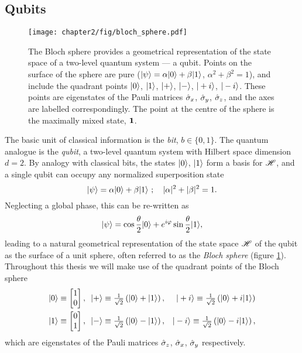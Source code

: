 \subsection{Qubits}
\label{sec:qubits}
\begin{figure}[t!]
\centering
\texttt{[image: chapter2/fig/bloch\_sphere.pdf]}
\caption[Bloch sphere]{
The Bloch sphere provides a geometrical representation of the state space of a two-level quantum system --- a qubit. Points on the surface of the sphere are pure ($\mbox{$ | \psi \rangle $} = \alpha \mbox{$ | 0 \rangle $} + \beta \mbox{$ | 1 \rangle $}$, $\alpha^2+\beta^2=1$), and include the quadrant points $\mbox{$ | 0 \rangle $}$, $\mbox{$ | 1 \rangle $}$, $\mbox{$ | + \rangle $}$, $\mbox{$ | - \rangle $}$, $\mbox{$ | +i \rangle $}$, $\mbox{$ | -i \rangle $}$. These points are eigenstates of the Pauli matrices $\hat{\sigma}_x$, $\hat{\sigma}_y$, $\hat{\sigma}_z$, and the axes are labelled correspondingly. The point at the centre of the sphere is the maximally mixed state, $\mathbf{1}$.
}
\label{fig:bloch-sphere}
\end{figure}

The basic unit of classical information is the \emph{bit}, $b \in \{ 0, 1\}$. The quantum analogue is the \emph{qubit}, a two-level quantum system with Hilbert space dimension $d=2$. By analogy with classical bits, the states $\mbox{$ | 0 \rangle $}$, $\mbox{$ | 1 \rangle $}$ form a basis for $\mathscr{H}$, and a single qubit can occupy any normalized superposition state
\begin{equation}
   \mbox{$ | \psi \rangle $} = \alpha \mbox{$ | 0 \rangle $} + \beta \mbox{$ | 1 \rangle $} ~ ; \quad |\alpha|^2+ |\beta|^2=1.
\end{equation}
Neglecting a global phase, this can be re-written as 
\begin{equation}
   \mbox{$ | \psi \rangle $}= \cos \frac{\theta}{2}\mbox{$ | 0 \rangle $} + e^{i \varphi} \sin \frac{\theta}{2} \mbox{$ | 1 \rangle $} ,
\end{equation}
leading to a natural geometrical representation of the state space $\mathscr{H}$ of the qubit as the surface of a unit sphere, often referred to as the \emph{Bloch sphere} (figure \ref{fig:bloch-sphere}). Throughout this thesis we will make use of the quadrant points of the Bloch sphere
\begin{eqnarray}
    \mbox{$ | 0 \rangle $} \equiv 
    \begin{bmatrix}
        1\\
        0
    \end{bmatrix}, ~~
    &\mbox{$ | + \rangle $}\equiv\tfrac{1}{\sqrt{2}}\left(\mbox{$ | 0 \rangle $}+\mbox{$ | 1 \rangle $}\right),
    &\mbox{$ | +i \rangle $}\equiv\tfrac{1}{\sqrt{2}}\left(\mbox{$ | 0 \rangle $}+i\mbox{$ | 1 \rangle $}\right)\\
    \mbox{$ | 1 \rangle $} \equiv
    \begin{bmatrix}
        0\\
        1
    \end{bmatrix}, ~~
    &\mbox{$ | - \rangle $}\equiv\tfrac{1}{\sqrt{2}}\left(\mbox{$ | 0 \rangle $}-\mbox{$ | 1 \rangle $}\right),
    &\mbox{$ | -i \rangle $}\equiv\tfrac{1}{\sqrt{2}}\left(\mbox{$ | 0 \rangle $}-i\mbox{$ | 1 \rangle $}\right),
\end{eqnarray}
which are eigenstates of the Pauli matrices $\hat{\sigma}_z$, $\hat{\sigma}_x$, $\hat{\sigma}_y$ respectively.

